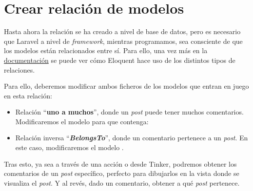 
\chapter{Crear relación de modelos}

Hasta ahora la relación se ha creado a nivel de base de datos, pero es necesario que Laravel a nivel de \textit{framework}, mientras programamos, sea consciente de que los modelos están relacionados entre sí. Para ello, una vez más en la \href{https://laravel.com/docs/10.x/eloquent-relationships#one-to-many}{documentación} se puede ver cómo Eloquent hace uso de los distintos tipos de relaciones.

Para ello, deberemos modificar ambos ficheros de los modelos que entran en juego en esta relación:
\begin{itemize}
    \item Relación “\textbf{uno a muchos}”, donde un \textit{post} puede tener muchos comentarios. Modificaremos el modelo  para que contenga:

    \item Relación inversa “\textit{\textbf{BelongsTo}}”, donde un comentario pertenece a un \textit{post}. En este caso, modificaremos el modelo .

\end{itemize}

Tras esto, ya sea a través de una acción o desde Tinker, podremos obtener los comentarios de un \textit{post} específico, perfecto para dibujarlos en la vista donde se visualiza el \textit{post}. Y al revés, dado un comentario, obtener a qué \textit{post} pertenece.